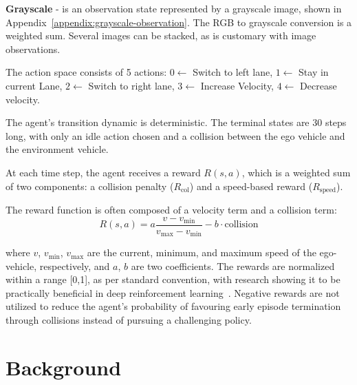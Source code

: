 \documentclass{article}
\begin{document}
\textbf{Grayscale} - is an observation state represented by a grayscale image, shown in Appendix~\ref{appendix:grayscale-observation}. The RGB to grayscale conversion is a weighted sum. Several images can be stacked, as is customary with image observations.

The action space consists of 5 actions:
$0 \leftarrow$ Switch to left lane, $1 \leftarrow$ Stay in current Lane, $2 \leftarrow$ Switch to right lane, $3 \leftarrow$ Increase Velocity, $4 \leftarrow$ Decrease velocity. 


The agent's transition dynamic is deterministic. The terminal states are 30 steps long, with only an idle action chosen and a collision between the ego vehicle and the environment vehicle.




At each time step, the agent receives a reward $R(s, a)$, which is a weighted sum of two components: a collision penalty ($R_{\text{col}}$) and a speed-based reward ($R_{\text{speed}}$).

The reward function is often composed of a velocity term and a collision term:
\vspace*{-7pt}
    $$R(s, a) = a \frac{v - v_{\min}}{v_{\max} - v_{\min}} - b \cdot \text{collision}$$
\vspace*{-9pt}

where $v$, $v_{\min}$, $v_{\max}$ are the current, minimum, and maximum speed of the ego-vehicle, respectively, and $a$, $b$ are two coefficients.
The rewards are normalized within a range [0,1], as per standard convention, with research showing it to be practically beneficial in deep reinforcement learning~\cite{mnih_human-level_2015}. 
Negative rewards are not utilized to reduce the agent's probability of favouring early episode termination through collisions instead of pursuing a challenging policy.

\section{Background}
\end{document}
